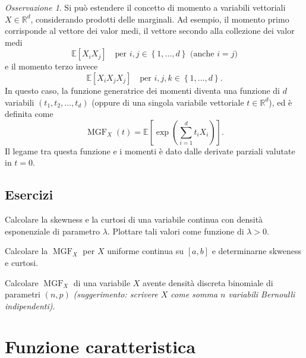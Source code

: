 \documentclass[
  italian,
  letterpaper,
]{book}
\newcommand{\bra}[1]{\left( #1 \right)}
\newcommand{\sqa}[1]{\left[ #1 \right]}
\newcommand{\cur}[1]{\left\{ #1 \right\}}
\newcommand{\R}{\mathbb{R}}
\newcommand{\E}[1]{\mathbb{E}\sqa{#1}}
\theoremstyle{definition}
\theoremstyle{remark}
\newtheorem*{remark}{Osservazione}
\begin{document}
\begin{remark}
Si può estendere il concetto di momento a variabili vettoriali
\(X \in \R^d\), considerando prodotti delle marginali. Ad esempio, il
momento primo corrisponde al vettore dei valor medi, il vettore secondo
alla collezione dei valor medi
\[ \E{X_i X_j} \quad \text{per $i, j \in \cur{1, \ldots, d}$ (anche $i=j$)}\]
e il momento terzo invece
\[ \E{X_i X_j X_j} \quad \text{per $i, j,k \in \cur{1, \ldots, d}$.}\]
In questo caso, la funzione generatrice dei momenti diventa una funzione
di \(d\) variabili \((t_1, t_2, \ldots, t_d)\) (oppure di una singola
variabile vettoriale \(t\in \R^d\)), ed è definita come
\[ \operatorname{MGF}_{X}(t) = \E{\exp \bra{ \sum_{i=1}^d t_i X_i}}.\]
Il legame tra questa funzione e i momenti è dato dalle derivate parziali
valutate in \(t=0\).
\end{remark}

\subsection{Esercizi}\label{esercizi-22}

Calcolare la skewness e la curtosi di una variabile continua con densità
esponenziale di parametro \(\lambda\). Plottare tali valori come
funzione di \(\lambda>0\).

Calcolare la \(\operatorname{MGF}_X\) per \(X\) uniforme continua su
\([a,b]\) e determinarne skweness e curtosi.

Calcolare \(\operatorname{MGF}_X\) di una variabile \(X\) avente densità
discreta binomiale di parametri \((n,p)\) \emph{(suggerimento: scrivere
\(X\) come somma \(n\) variabili Bernoulli indipendenti)}.

\section{Funzione caratteristica}\label{sec-caratteristica}
\end{document}
